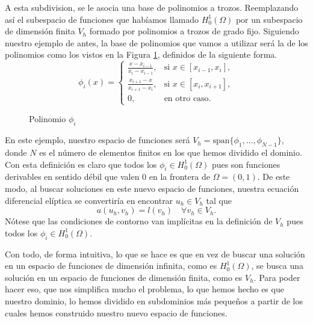 \documentclass[a4paper,11pt,spanish, twoside, leqno]{tfg-uam}
\theoremstyle{definition}
\begin{document}
A esta subdivision, se le asocia una base de polinomios a trozos. Reemplazando así el subespacio de funciones que habíamos llamado $H_0^1(\Omega)$ por un subespacio de dimensión finita $V_h$ formado por polinomios a trozos  de grado fijo. Siguiendo nuestro ejemplo de antes, la base de polinomios que vamos a utilizar será la de los polinomios como los vistos en la Figura \ref{fig:BasePolinomios}, definidos de la siguiente forma.
\begin{equation*}
    \phi_i(x) = \begin{cases}
        \frac{x-x_{i-1}}{x_i-x_{i-1}}, & \text{si } x\in[x_{i-1},x_i],\\
        \frac{x_{i+1}-x}{x_{i+1}-x_i}, & \text{si } x\in[x_i,x_{i+1}],\\
        0, & \text{en otro caso}.
    \end{cases} 
\end{equation*}

\begin{figure}
    \centering
    \caption{Polinomio $\phi_i$}
    \label{fig:BasePolinomios}
\end{figure}

En este ejemplo, nuestro espacio de funciones será $V_h = \text{span}\{\phi_1,\dots,\phi_{N-1}\}$, donde $N$ es el número de elementos finitos en los que hemos dividido el dominio. Con esta definición es claro que todos los $\phi_i\in H_0^1(\Omega)$ pues son funciones derivables en sentido débil que valen $0$ en la frontera de $\Omega =(0,1)$. De este modo, al buscar soluciones en este nuevo espacio de funciones, nuestra ecuación diferencial elíptica se convertiría en encontrar $u_h\in V_h$ tal que
\begin{equation*}
    a(u_h,v_h) = l(v_h) \quad \forall v_h\in V_h.
\end{equation*}
Nótese que las condiciones de contorno van implícitas en la definición de $V_h$ pues todos los $\phi_i\in H_0^1(\Omega)$. 

Con todo, de forma intuitiva, lo que se hace es que en vez de buscar una solución en un espacio de funciones de dimensión infinita, como es $H_0^1(\Omega)$, se busca una solución en un espacio de funciones de dimensión finita, como es $V_h$. Para poder hacer eso, que nos simplifica mucho el problema, lo que hemos hecho es que nuestro dominio, lo hemos dividido en subdominios más pequeños a partir de los cuales hemos construido nuestro nuevo espacio de funciones. 
\end{document}
